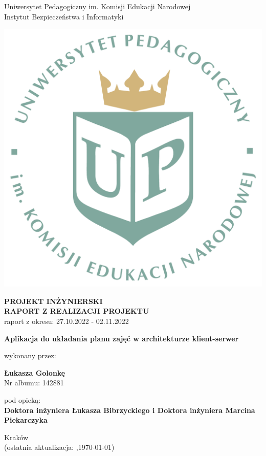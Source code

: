 \documentclass[12pt,a4paper,oneside]{article}
\theoremstyle{definition}
\numberwithin{equation}{section}
\begin{document}

\thispagestyle{empty}
\begin{titlepage}
\begin{center}\Large
Uniwersytet Pedagogiczny im. Komisji Edukacji Narodowej \\
\large
Instytut Bezpieczeństwa i Informatyki\\
\vskip 10pt
\end{center}
\begin{center}
\centering \includegraphics[width=0.4\columnwidth]{../resources/images/logoUP_pl.pdf}
\end{center}

\begin{center}
 {\bf \fontsize{14pt}{14pt}\selectfont PROJEKT INŻYNIERSKI \\ RAPORT Z REALIZACJI PROJEKTU\\
 }
 {\fontsize{12pt}{12pt} raport z okresu: 27.10.2022 - 02.11.2022}
\end{center}
\vskip 5pt
\begin{center}
 {\bf \fontsize{22pt}{22pt}\selectfont Aplikacja do układania planu zajęć w architekturze klient-serwer}
\end{center}

\begin{center}
 {\fontsize{12pt}{12pt}\selectfont wykonany przez: }
\end{center}
\begin{center}
 {\bf\fontsize{16pt}{16pt}\selectfont Łukasza Golonkę}\\
 {\fontsize{12pt}{12pt}\selectfont Nr albumu: 142881 \\}
\end{center}
\begin{center}
 {\fontsize{12pt}{12pt}\selectfont pod opieką:}\\
 {\bf\fontsize{12pt}{12pt}\selectfont Doktora inżyniera Łukasza Bibrzyckiego i Doktora inżyniera Marcina Piekarczyka}
\end{center}

\vspace*{\fill}
\begin{center}
\large
Kraków \the\year\\
(ostatnia aktualizacja: \DTMcurrenttime,\;\today)
\end{center}
\end{titlepage}
\setcounter{page}{0} 
\newpage\null\thispagestyle{empty}
\end{document}
